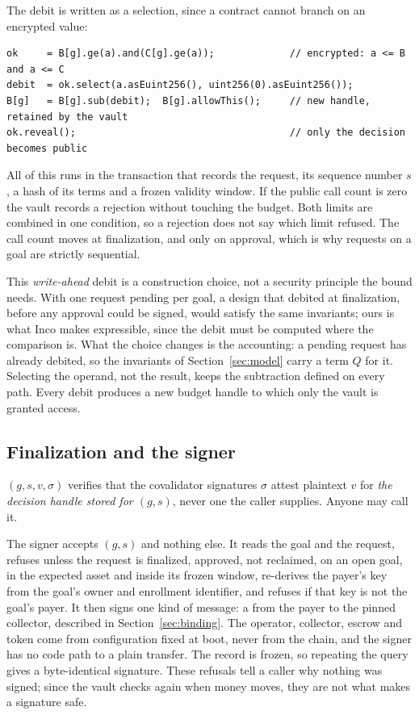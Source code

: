 The debit is written as a selection, since a contract cannot branch on an encrypted value:

\begin{lstlisting}[language=Solidity]
ok     = B[g].ge(a).and(C[g].ge(a));             // encrypted: a <= B and a <= C
debit  = ok.select(a.asEuint256(), uint256(0).asEuint256());
B[g]   = B[g].sub(debit);  B[g].allowThis();     // new handle, retained by the vault
ok.reveal();                                     // only the decision becomes public
\end{lstlisting}

All of this runs in the transaction that records the request, its sequence number $s$, a hash of its terms and a
frozen validity window. If the public call count is zero the vault records a rejection without touching the budget.
Both limits are combined in one condition, so a rejection does not say which limit refused. The call count moves at
finalization, and only on approval, which is why requests on a goal are strictly sequential.

This \emph{write-ahead} debit is a construction choice, not a security principle the bound needs. With one request
pending per goal, a design that debited at finalization, before any approval could be signed, would satisfy the same
invariants; ours is what Inco makes expressible, since the debit must be computed where the comparison is. What the
choice changes is the accounting: a pending request has already debited, so the invariants of
Section~\ref{sec:model} carry a term $Q$ for it. Selecting the operand, not the result, keeps the subtraction defined
on every path. Every debit produces a new budget handle to which only the vault is granted access.

\subsection{Finalization and the signer}
\label{sec:signer}

$(g, s, v, \sigma)$ verifies that the covalidator signatures $\sigma$ attest plaintext $v$ for
\emph{the decision handle stored for $(g, s)$}, never one the caller supplies. Anyone may call it.

The signer accepts $(g, s)$ and nothing else. It reads the goal and the request, refuses unless the request is finalized,
approved, not reclaimed, on an open goal, in the expected asset and inside its frozen window, re-derives the payer's key
from the goal's owner and enrollment identifier, and refuses if that key is not the goal's payer. It then signs one kind of
message: a  from the payer to the pinned collector, described in Section~\ref{sec:binding}.
The operator, collector, escrow and token come from configuration fixed at boot, never from the chain, and the signer has no
code path to a plain transfer. The record is frozen, so repeating the query gives a byte-identical signature. These refusals
tell a caller why nothing was signed; since the vault checks again when money moves, they are not what makes a signature safe.

